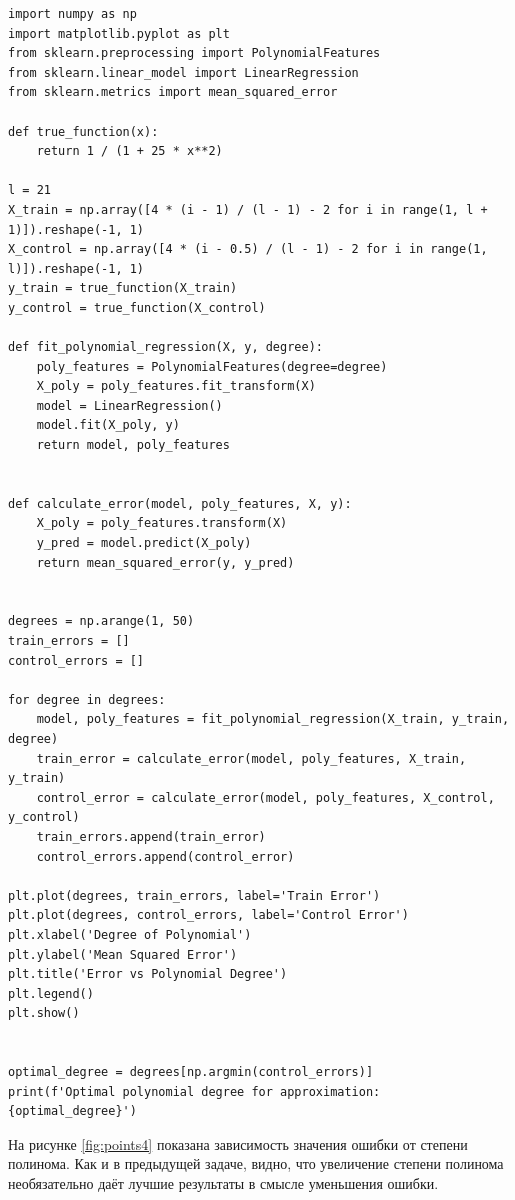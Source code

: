 \documentclass[12pt]{report}
\begin{document}
\begin{lstlisting}[label=lst:gen2,caption=код, решающий поставленную задачу]
import numpy as np
import matplotlib.pyplot as plt
from sklearn.preprocessing import PolynomialFeatures
from sklearn.linear_model import LinearRegression
from sklearn.metrics import mean_squared_error

def true_function(x):
    return 1 / (1 + 25 * x**2)

l = 21
X_train = np.array([4 * (i - 1) / (l - 1) - 2 for i in range(1, l + 1)]).reshape(-1, 1)
X_control = np.array([4 * (i - 0.5) / (l - 1) - 2 for i in range(1, l)]).reshape(-1, 1)
y_train = true_function(X_train)
y_control = true_function(X_control)

def fit_polynomial_regression(X, y, degree):
    poly_features = PolynomialFeatures(degree=degree)
    X_poly = poly_features.fit_transform(X)
    model = LinearRegression()
    model.fit(X_poly, y)
    return model, poly_features


def calculate_error(model, poly_features, X, y):
    X_poly = poly_features.transform(X)
    y_pred = model.predict(X_poly)
    return mean_squared_error(y, y_pred)


degrees = np.arange(1, 50)
train_errors = []
control_errors = []

for degree in degrees:
    model, poly_features = fit_polynomial_regression(X_train, y_train, degree)
    train_error = calculate_error(model, poly_features, X_train, y_train)
    control_error = calculate_error(model, poly_features, X_control, y_control)
    train_errors.append(train_error)
    control_errors.append(control_error)

plt.plot(degrees, train_errors, label='Train Error')
plt.plot(degrees, control_errors, label='Control Error')
plt.xlabel('Degree of Polynomial')
plt.ylabel('Mean Squared Error')
plt.title('Error vs Polynomial Degree')
plt.legend()
plt.show()


optimal_degree = degrees[np.argmin(control_errors)]
print(f'Optimal polynomial degree for approximation: {optimal_degree}')

\end{lstlisting}


На рисунке \ref{fig:points4} показана зависимость значения ошибки от степени полинома. Как и в предыдущей задаче, видно, что увеличение степени полинома необязательно даёт лучшие результаты в смысле уменьшения ошибки.
\end{document}
